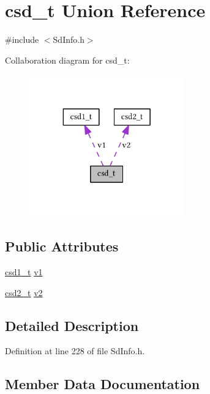 \hypertarget{unioncsd__t}{}\section{csd\+\_\+t Union Reference}
\label{unioncsd__t}


{\ttfamily \#include $<$Sd\+Info.\+h$>$}



Collaboration diagram for csd\+\_\+t\+:\nopagebreak
\begin{figure}[H]
\begin{center}
\leavevmode
\includegraphics[width=190pt]{unioncsd__t__coll__graph}
\end{center}
\end{figure}
\subsection*{Public Attributes}
\begin{DoxyCompactItemize}
\item 
\hyperlink{_sd_info_8h_a4dc5a2aea3d7715c82094bce06e1b3a7}{csd1\+\_\+t} \hyperlink{unioncsd__t_acb1d09f122f32629d8d6faa9edcc943b}{v1}
\item 
\hyperlink{_sd_info_8h_a3e07997926302b26d47ffb0535da9d01}{csd2\+\_\+t} \hyperlink{unioncsd__t_a19b60555856c9a485bcf4a84c248bfea}{v2}
\end{DoxyCompactItemize}


\subsection{Detailed Description}


Definition at line 228 of file Sd\+Info.\+h.



\subsection{Member Data Documentation}
